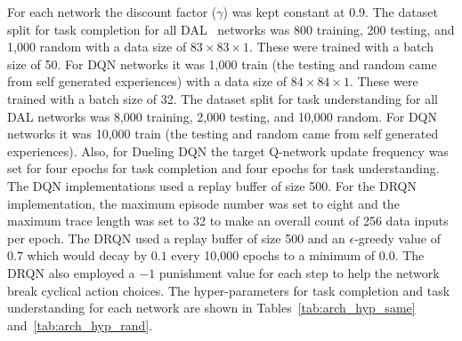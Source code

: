 \documentclass[12pt,american]{report}
\begin{document}
For each network the discount factor ($\gamma$) was kept constant at 0.9.  The dataset split for task completion for all DAL~\cite{markovikj2014deep} networks was 800 training, 200 testing, and 1,000 random with a data size of $83\times 83\times 1$.  These were trained with a batch size of 50. For DQN networks it was 1,000 train (the testing and random came from self generated experiences) with a data size of $84\times 84\times 1$. These were trained with a batch size of 32. The dataset split for task understanding for all DAL networks was 8,000 training, 2,000 testing, and 10,000 random. For DQN networks it was 10,000 train (the testing and random came from self generated experiences).  Also, for Dueling DQN the target Q-network update frequency was set for four epochs for task completion and four epochs for task understanding. The DQN implementations used a replay buffer of size 500. For the DRQN implementation, the maximum episode number was set to eight and the maximum trace length was set to 32 to make an overall count of 256 data inputs per epoch. The DRQN used a replay buffer of size 500 and an $\epsilon$-greedy value of $0.7$ which would decay by $0.1$ every 10,000 epochs to a minimum of 0.0. The DRQN also employed a $-1$ punishment value for each step to help the network break cyclical action choices. The hyper-parameters for task completion and task understanding for each network are shown in Tables~\ref{tab:arch_hyp_same} and~\ref{tab:arch_hyp_rand}.  
\end{document}
